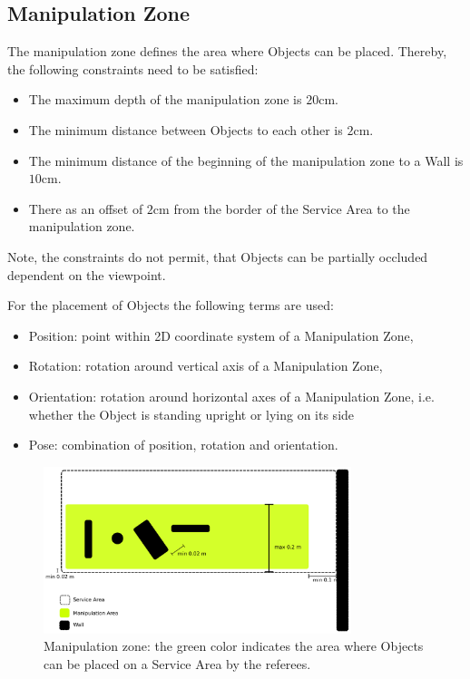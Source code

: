 \subsection{Manipulation Zone} \label{ssec:ManipulationZone}
The manipulation zone defines the area where Objects can be placed. Thereby, the following constraints need to be satisfied:
\begin{itemize}
	\item The maximum depth of the manipulation zone is $20\si{\centi\meter}$.
	\item The minimum distance between Objects to each other is $2\si{\centi\meter}$.
	\item The minimum distance of the beginning of the manipulation zone to a Wall is $10\si{\centi\meter}$.
	\item There as an offset of $2\si{\centi\meter}$ from the border of the Service Area to the manipulation zone.
\end{itemize}
Note, the constraints do not permit, that Objects can be partially occluded dependent on the viewpoint.

For the placement of Objects the following terms are used:

\begin{itemize}
	\item Position: point within 2D coordinate system of a Manipulation Zone,
	\item Rotation: rotation around vertical axis of a Manipulation Zone,
	\item Orientation: rotation around horizontal axes of a Manipulation Zone, i.e. whether the Object is standing upright or lying on its side
	\item Pose: combination of position, rotation and orientation.
\end{itemize}
\begin{figure} [h!]
\centering
\includegraphics[width=0.8\textwidth ]{./images/manipulation_zone.pdf}
\caption{Manipulation zone: the green color indicates the area where Objects can be placed on a Service Area by the referees.}
\label{fig:manipulation_zone}
\end{figure}

